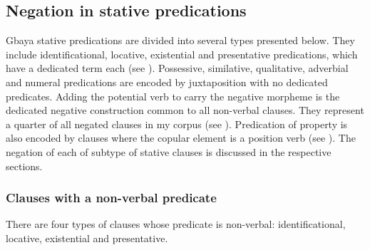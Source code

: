 \documentclass[output=paper,colorlinks=true, citecolor=brown]{langscibook}
\begin{document}
\subsection{Negation in stative predications}\label{sec:gba:2.3}

Gbaya stative predications are divided into several types presented below. They include identificational, locative, existential and presentative predications, which have a dedicated term each (see ). Possessive, similative, qualitative, adverbial and numeral predications are encoded by juxtaposition with no dedicated predicates. Adding the potential verb to carry the negative morpheme is the dedicated negative construction common to all non-verbal clauses. They represent a quarter of all negated clauses in my corpus (see ). Predication of property is also  encoded by clauses where the copular element is a position verb (see ). The negation of each of subtype of stative clauses is discussed in the respective sections.


\subsubsection{Clauses with a non-verbal predicate}\label{sec:gba:2.3.1}

There are four types of clauses whose predicate is non-verbal: identificational, locative, existential and presentative.

\begin{table}
\caption{Negation of clauses with a non-verbal predicate}
\label{tab:gba:4}
\end{table}
\end{document}
